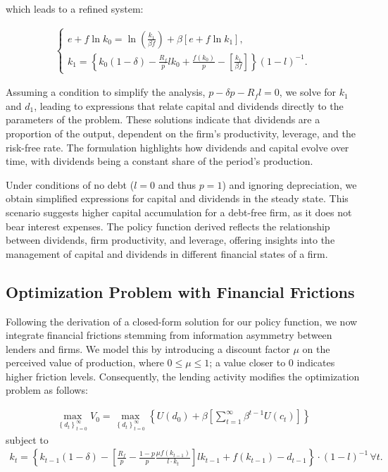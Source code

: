 \documentclass[12pt]{article}
\begin{document}
which leads to a refined system:


\begin{align*}
    \begin{cases}
        e + f \ln{k_0} = \ln{\left(\frac{k_1}{\beta f}\right)} + \beta [e + f \ln{k_1}], \\
        k_1 = \left\{k_0(1 - \delta) - \frac{R_f}{p} l k_0 + \frac{f(k_0)}{p} - \left[ \frac{k_1}{\beta f}\right] \right\}{(1-l)}^{-1}.
    \end{cases}
\end{align*}


Assuming a condition to simplify the analysis, \(p - \delta p - R_f l=0\), we solve for \(k_1\) and \(d_1\), leading to
expressions that relate capital and dividends directly to the parameters of the problem. These solutions indicate that
dividends are a proportion of the output, dependent on the firm's productivity, leverage, and the risk-free rate. The
formulation highlights how dividends and capital evolve over time,  with dividends being a constant share of the
period's production.

Under conditions of no debt (\(l=0\) and thus \(p=1\)) and ignoring depreciation, we obtain simplified expressions for
capital and dividends in the steady state. This scenario suggests higher capital accumulation for a debt-free firm, as
it does not bear interest expenses. The policy function derived reflects the relationship between dividends, firm
productivity, and leverage, offering insights into the management of capital  and dividends in different financial
states of a firm.

\subsection{Optimization Problem with Financial Frictions}

Following the derivation of a closed-form solution for our policy function, we now integrate financial frictions
stemming from information  asymmetry between lenders and firms. We model this by introducing a discount factor \(\mu\)
on the perceived value of production, where \(0 \leq \mu \leq 1\); a value closer to 0 indicates higher friction levels.
Consequently, the lending activity modifies the optimization problem as follows:

\begin{align*}
    \max _{\left\{d_t\right\}_{t=0}^{\infty}} V_0 = \max _{\left\{d_t\right\}_{t=0}^{\infty}} \left\{ U(d_0) + \beta \left[ \sum_{t=1}^{\infty} \beta^{t-1} U(c_t) \right] \right\}
\end{align*}
subject to
\begin{align*}
    k_t = \left\{ k_{t-1}(1 - \delta) - \left[ \frac{R_f}{p} - \frac{1-p}{p} \frac{\mu f(k_{t-1})}{l \cdot k_t} \right] l k_{t-1} + f(k_{t-1}) - d_{t-1} \right\} \cdot \left(1-l\right)^{-1} \, \forall t.
\end{align*}
\end{document}
